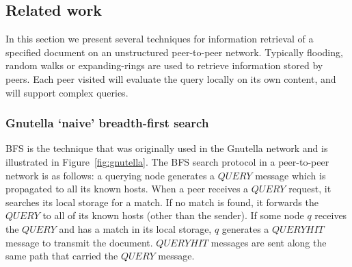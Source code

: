 


\subsection{Related work}

In this section we present several techniques for information retrieval of a specified document on an unstructured peer-to-peer network. Typically flooding, random walks or expanding-rings are used to retrieve information stored by peers. Each peer visited will evaluate the query locally on its own content, and will support complex queries\cite{lua2005survey}.

\subsubsection{Gnutella `naive' breadth-first search}

BFS is the technique that was originally used in the Gnutella network and is illustrated in Figure~\ref{fig:gnutella}. The BFS search protocol in a peer-to-peer network is as follows: a querying node generates a $QUERY$ message which is propagated to all its known hosts. When a peer receives a $QUERY$ request, it searches its local storage for a match. If no match is found, it forwards the $QUERY$ to all of its known hosts (other than the sender). If some node $q$ receives the $QUERY$ and has a match in its local storage, $q$ generates a $QUERYHIT$ message to transmit the document. $QUERYHIT$ messages are sent along the same path that carried the $QUERY$ message\cite{zeinalipour2004ir}.

